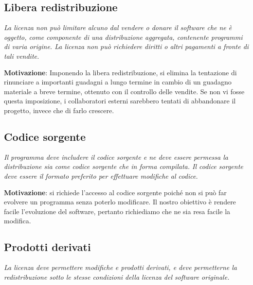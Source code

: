 \subsection{Libera redistribuzione}

\begin{center}

\textit{La licenza non può limitare alcuno dal vendere o donare il software che ne è oggetto, come componente di una distribuzione aggregata, contenente programmi di varia origine. La licenza non può richiedere diritti o altri pagamenti a fronte di tali vendite.}

\end{center}

\textbf{Motivazione}: Imponendo la libera redistribuzione, si elimina la tentazione di rinunciare a importanti guadagni a lungo termine in cambio di un guadagno materiale a breve termine, ottenuto con il controllo delle vendite. Se non vi fosse questa imposizione, i collaboratori esterni sarebbero tentati di abbandonare il progetto, invece che di farlo crescere.

\subsection{Codice sorgente}

\begin{center}

\textit{Il programma deve includere il codice sorgente e ne deve essere permessa la distribuzione sia come codice sorgente che in forma compilata. Il codice sorgente deve essere il formato preferito per effettuare modifiche al codice.}

\end{center}

\textbf{Motivazione}: si richiede l'accesso al codice sorgente poiché non si può far evolvere un programma senza poterlo modificare. Il nostro obiettivo è rendere facile l'evoluzione del software, pertanto richiediamo che ne sia resa facile la modifica.

\subsection{Prodotti derivati}

\begin{center}

\textit{La licenza deve permettere modifiche e prodotti derivati, e deve permetterne la redistribuzione sotto le stesse condizioni della licenza del software originale.}

\end{center}

